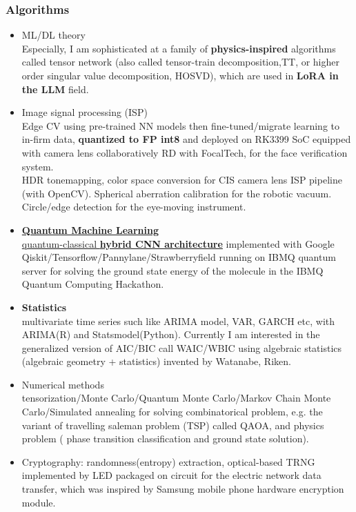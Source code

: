 \begin{skillbox}
\subsubsection*{Algorithms}
\begin{itemize}[noitemsep]
    \item ML/DL theory\\ Especially, I am sophisticated at a family of \textbf{physics-inspired} algorithms called tensor network (also called tensor-train decomposition,TT, or higher order singular value decomposition, HOSVD), which are used in \textbf{LoRA in the LLM} field. 
    \item Image signal processing (ISP) \\
    Edge CV using pre-trained NN models then fine-tuned/migrate learning to in-firm data,\textbf{ quantized to FP int8 }and deployed on RK3399 SoC equipped with camera lens collaboratively RD with FocalTech, for the face verification system.\\
    HDR tonemapping, color space conversion for CIS camera lens ISP pipeline (with OpenCV). Spherical aberration calibration for the robotic vacuum. \\
    Circle/edge detection for the eye-moving instrument.  
    \item \href{https://github.com/Kuo-TingKai/IBMQcamp2020_VQE_team}{\textbf{Quantum Machine Learning}\\ quantum-classical\textbf{ hybrid CNN architecture}} implemented with Google Qiskit/Tensorflow/Pannylane/Strawberryfield running on IBMQ quantum server for solving the ground state energy of the molecule in the IBMQ Quantum Computing Hackathon.\\
    \item \textbf{Statistics}\\ multivariate time series such like ARIMA model, VAR, GARCH etc, with ARIMA(R) and Statsmodel(Python). Currently I am interested in the generalized version of AIC/BIC call WAIC/WBIC using algebraic statistics (algebraic geometry + statistics) invented by Watanabe, Riken.
    \item Numerical methods\\tensorization/Monte Carlo/Quantum Monte Carlo/Markov Chain Monte Carlo/Simulated annealing for solving combinatorical problem, e.g. the variant of travelling saleman problem (TSP) called QAOA, and physics problem ( phase transition classification and ground state solution).
    \item Cryptography: randomness(entropy) extraction, optical-based TRNG implemented by LED packaged on circuit for the electric network data transfer, which was inspired by Samsung mobile phone hardware encryption module.
\end{itemize}
\end{skillbox}

